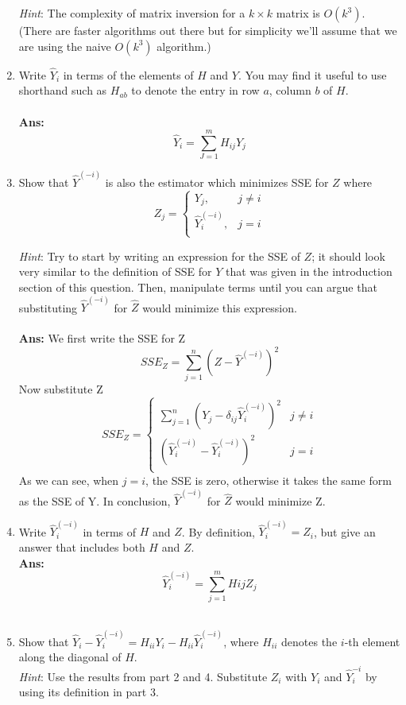 \begin{enumerate}
  \emph{Hint}: The complexity of matrix inversion for a $k\times k$
  matrix is $O(k^3)$.  (There are faster algorithms out there but for
  simplicity we'll assume that we are using the naive $O(k^3)$
  algorithm.)


\item  Write $\hat{Y}_i$ in terms of the elements of $H$ and
  $Y$.  You may find it useful to use shorthand such as $H_{ab}$ to
  denote the entry in row $a$, column $b$ of $H$.
  \\
  \\{\bf Ans: }
  \[\hat{Y}_i = \sum_{J=1}^{m}H_{ij}Y_j \]


\item Show that $\hat{Y}^{(-i)}$ is also the estimator
  which minimizes SSE for $Z$ where
  \[
  Z_j = \left\{\begin{array}{cc}
  Y_j, & j\neq i \\
  \hat{Y}_i^{(-i)}, & j=i \\
  \end{array}\right.
  \]

  \emph{Hint}: Try to start by writing an expression for the SSE of
  $Z$; it should look very similar to the definition of SSE for $Y$
  that was given in the introduction section of this question.  Then,
  manipulate terms until you can argue that substituting
  $\hat{Y}^{(-i)}$ for $\hat{Z}$ would minimize this expression.
  \\
    \\
    {\bf Ans: }
    We first write the SSE for Z
    \[SSE_Z =  \sum^n_{j = 1}(Z-\hat{Y}^{(-i)})^2\]
    Now substitute Z
  \[
  SSE_Z = \left\{\begin{array}{cc}
  \sum_{j=1}^n (Y_j - \delta_{ij}\hat{Y}_i^{(-i)})^2 & j \neq i \\
  (\hat{Y}_i^{(-i)} - \hat{Y}_i^{(-i)})^2 & j = i \\
  \end{array}\right.
  \]    
    As we can see, when $j = i$, the SSE is zero, otherwise it takes the same form as the SSE of Y. In conclusion, $\hat{Y}^{(-i)}$ for $\hat{Z}$ would minimize Z.


\item   Write $\hat{Y}_i^{(-i)}$ in terms of $H$ and $Z$. By
definition, $\hat{Y}_i^{(-i)} = Z_i$, but give an answer that includes both
$H$ and $Z$.
\\
 {\bf Ans: }
\[
\hat{Y}_i^{(-i)} = \sum_{j=1}^m H{ij}Z_j
\]
\\
\item  \label{it:diag}
Show that $\hat{Y}_i - \hat{Y}_i^{(-i)} = H_{ii}Y_i - H_{ii}\hat{Y}_i^{(-i)}$,
where $H_{ii}$ denotes the $i$-th element along the diagonal of $H$.\\
 \emph{Hint}: Use the results from  part 2 and 4. Substitute $Z_i$ with $Y_i$ and $\hat{Y}_i^{-i}$ by using its definition in part 3.


\end{enumerate}
